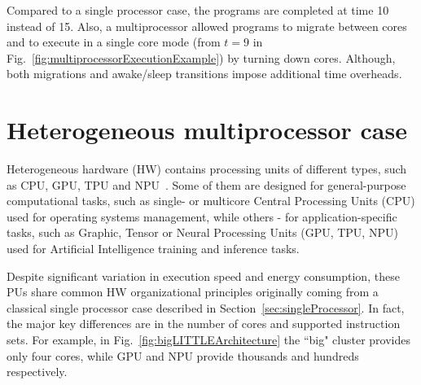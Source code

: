 Compared to a single processor case, the programs are completed at time 10 instead of 15. Also, a multiprocessor allowed programs to migrate between cores and to execute in a single core mode (from $t=9$ in Fig.~\ref{fig:multiprocessorExecutionExample}) by turning down cores. Although, both migrations and awake/sleep transitions impose additional time overheads.


\section{Heterogeneous multiprocessor case}
\label{sec:heterogeneousCase}

Heterogeneous hardware (HW) contains processing units of different types, such as CPU, GPU, TPU and NPU~\cite{Brodtkorb2010}. Some of them are designed for general-purpose computational tasks, such as single- or multicore Central Processing Units (CPU) used for operating systems management, while others \-- for application-specific tasks, such as Graphic, Tensor or Neural Processing Units (GPU, TPU, NPU) used for Artificial Intelligence training and inference tasks.

Despite significant variation in execution speed and energy consumption, these PUs share common HW organizational principles originally coming from a classical single processor case described in Section~\ref{sec:singleProcessor}. In fact, the major key differences are in the number of cores and supported instruction sets. For example, in Fig.~\ref{fig:bigLITTLEArchitecture} the ``big" cluster provides only four cores, while GPU and NPU provide thousands and hundreds respectively.

